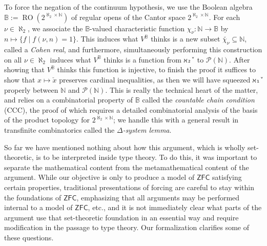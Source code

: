 \documentclass[a4paper,USenglish,cleveref, autoref]{lipics-v2019}
\newcommand{\B}{\mathbb{B}}
\newcommand{\lil}{\lstinline}
\theoremstyle{theorem}
\theoremstyle{definition}
\begin{document}
To force the negation of the continuum hypothesis, we use the Boolean algebra $\B := \operatorname{RO}(2^{\aleph_2 \times \mathbb{N}})$ of regular opens of the Cantor space $2^{\aleph_2 \times \mathbb{N}}$. For each $\nu \in \aleph_2$, we associate the $\B$-valued characteristic function $\chi_\nu : \mathbb{N} \to \B$ by $n \mapsto \{f \operatorname{|} f(\nu, n) = 1\}$. This induces what $V^\B$ thinks is a new subset $\widetilde{\chi_{\nu}} \subseteq \mathbb{N}$, called a \emph{Cohen real}, and furthermore, simultaneously performing this construction on all $\nu \in \aleph_2$ induces what $V^\B$ thinks is a function from \lil{ℵ₂̌ } to $\mathcal{P}(\mathbb{N})$. After showing that $V^\B$ thinks this function is injective, to finish the proof it suffices to show that $x \mapsto \check{x}$ preserves cardinal inequalities, as then we will have squeezed \lil{ℵ₁̌ } properly between $\mathbb{N}$ and $\mathcal{P}(\mathbb{N})$. This is really the technical heart of the matter, and relies on a combinatorial property of $\B$ called the \emph{countable chain condition} (CCC), the proof of which requires a detailed combinatorial analysis of the basis of the product topology for $2^{\aleph_2 \times \mathbb{N}}$; we handle this with a general result in transfinite combinatorics called the \emph{$\Delta$-system lemma}.

So far we have mentioned nothing about how this argument, which is wholly set-theoretic, is to be interpreted inside type theory. To do this, it was important to separate the mathematical content from the metamathematical content of the argument. While our objective is only to produce a model of $\mathsf{ZFC}$ satisfying certain properties, traditional presentations of forcing are careful to stay within the foundations of $\mathsf{ZFC}$, emphasizing that all arguments may be performed internal to a model of $\mathsf{ZFC}$, etc., and it is not immediately clear what parts of the argument use that set-theoretic foundation in an essential way %
and require modification in the passage to type theory. Our formalization clarifies some of these questions.
\end{document}
